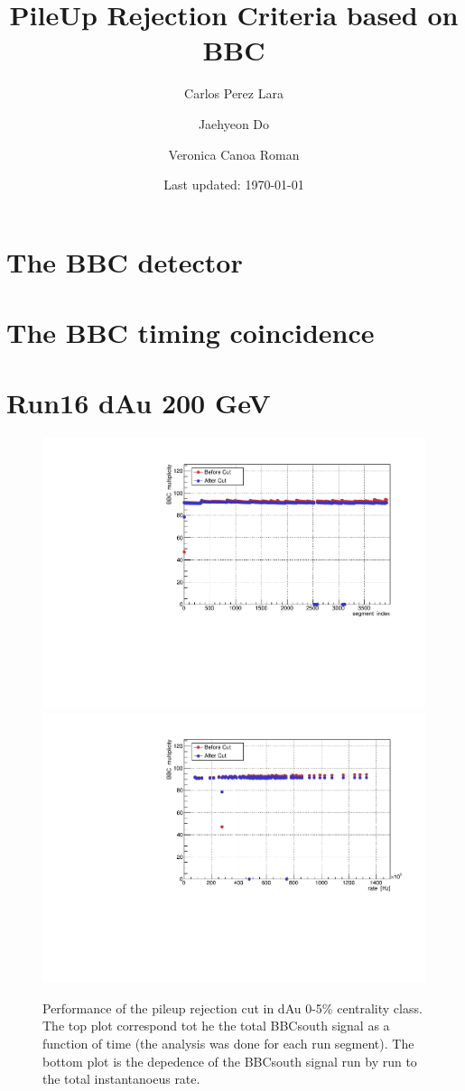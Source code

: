 \documentclass{article}
\title{PileUp Rejection Criteria based on BBC}
\author{Carlos Perez Lara\and Jaehyeon Do \and Veronica Canoa Roman}
\date{Last updated: \today}
\begin{document}
\maketitle

\section{The BBC detector}
\section{The BBC timing coincidence}
\section{Run16 dAu 200 GeV}
\begin{figure}
\includegraphics[width=\textwidth]{fig_pileup/dAu200MB_TimingBBC_BBCM}\\
\includegraphics[width=\textwidth]{fig_pileup/dAu200MB_TimingBBC_RATEBBCM}
\label{fig.dau200mb.bbcrate}
\caption{Performance of the pileup rejection cut in dAu 0-5\% centrality class. The top plot correspond tot he the total BBCsouth signal as a function of time (the analysis was done for each run segment). The bottom plot is the depedence of the BBCsouth signal run by run to the total instantanoeus rate.}
\end{figure}


%
\end{document}
